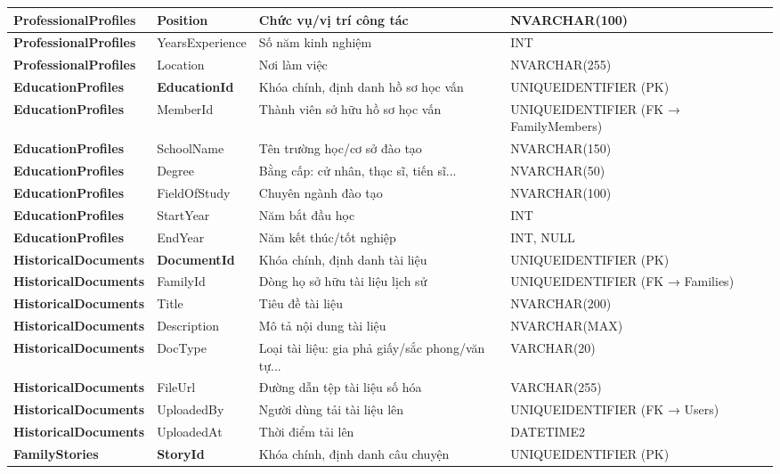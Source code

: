 \begin{longtable}{|p{}|p{}|p{}|p{}|}
\textbf{ProfessionalProfiles} & Position & Chức vụ/vị trí công tác & NVARCHAR(100) \\ \hline
\textbf{ProfessionalProfiles} & YearsExperience & Số năm kinh nghiệm & INT \\ \hline
\textbf{ProfessionalProfiles} & Location & Nơi làm việc & NVARCHAR(255) \\ \hline
\textbf{EducationProfiles} & \textbf{EducationId} & Khóa chính, định danh hồ sơ học vấn & UNIQUEIDENTIFIER (PK) \\ \hline
\textbf{EducationProfiles} & MemberId & Thành viên sở hữu hồ sơ học vấn & UNIQUEIDENTIFIER (FK → FamilyMembers) \\ \hline
\textbf{EducationProfiles} & SchoolName & Tên trường học/cơ sở đào tạo & NVARCHAR(150) \\ \hline
\textbf{EducationProfiles} & Degree & Bằng cấp: cử nhân, thạc sĩ, tiến sĩ... & NVARCHAR(50) \\ \hline
\textbf{EducationProfiles} & FieldOfStudy & Chuyên ngành đào tạo & NVARCHAR(100) \\ \hline
\textbf{EducationProfiles} & StartYear & Năm bắt đầu học & INT \\ \hline
\textbf{EducationProfiles} & EndYear & Năm kết thúc/tốt nghiệp & INT, NULL \\ \hline
\textbf{HistoricalDocuments} & \textbf{DocumentId} & Khóa chính, định danh tài liệu & UNIQUEIDENTIFIER (PK) \\ \hline
\textbf{HistoricalDocuments} & FamilyId & Dòng họ sở hữu tài liệu lịch sử & UNIQUEIDENTIFIER (FK → Families) \\ \hline
\textbf{HistoricalDocuments} & Title & Tiêu đề tài liệu & NVARCHAR(200) \\ \hline
\textbf{HistoricalDocuments} & Description & Mô tả nội dung tài liệu & NVARCHAR(MAX) \\ \hline
\textbf{HistoricalDocuments} & DocType & Loại tài liệu: gia phả giấy/sắc phong/văn tự... & VARCHAR(20) \\ \hline
\textbf{HistoricalDocuments} & FileUrl & Đường dẫn tệp tài liệu số hóa & VARCHAR(255) \\ \hline
\textbf{HistoricalDocuments} & UploadedBy & Người dùng tải tài liệu lên & UNIQUEIDENTIFIER (FK → Users) \\ \hline
\textbf{HistoricalDocuments} & UploadedAt & Thời điểm tải lên & DATETIME2 \\ \hline
\textbf{FamilyStories} & \textbf{StoryId} & Khóa chính, định danh câu chuyện & UNIQUEIDENTIFIER (PK) \\ \hline

\end{longtable}
